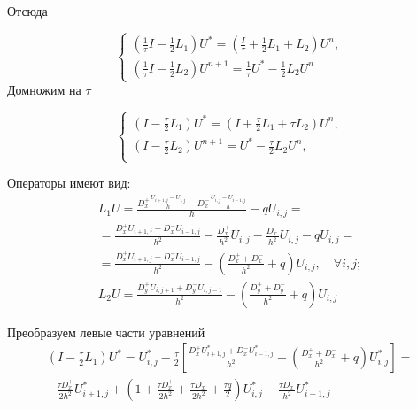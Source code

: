 \documentclass[a4paper,12pt]{article}
\begin{document}
Отсюда

\begin{equation}
  \begin{cases}
    \left( \frac{1}{\tau} I - \frac{1}{2} L_1 \right) U^* = \left( \frac{I}{\tau} + \frac{1}{2} L_1 + L_2 \right) U^n, \\
    \left( \frac{1}{\tau} I - \frac{1}{2} L_2 \right) U^{n+1} = \frac{1}{\tau} U^* - \frac{1}{2} L_2 U^n
  \end{cases}
\end{equation}
Домножим на $\tau$

\begin{equation}
  \label{eq:Douglas-Gunn-2d}
  \begin{cases}
    \left( I - \frac{\tau}{2} L_1 \right) U^* = \left( I + \frac{\tau}{2} L_1 + \tau L_2 \right) U^n, \\
    \left( I - \frac{\tau}{2} L_2 \right) U^{n+1} = U^* - \frac{\tau}{2} L_2 U^n, \\
  \end{cases}
\end{equation}

Операторы имеют вид:
\begin{equation}
  \begin{aligned}
    L_1 U = \frac{D^+_x \frac{U_{i+1,j} - U_{i,j}}{h} - D^-_x\frac{U_{i,j} - U_{i-1,j}}{h}}{h}  - qU_{i,j} = \\
    = \frac{D^+_x U_{i+1,j} + D^-_x U_{i-1,j}}{h^2} - \frac{D^+_x}{h^2}U_{i,j} - \frac{D^-_x}{h^2} U_{i,j} - q U_{i,j} = \\
    = \frac{D^+_x U_{i+1,j} + D^-_x U_{i-1,j}}{h^2} - \left(\frac{D^+_x + D^-_x}{h^2} + q \right) U_{i,j}, \quad \forall i,j; \\
    L_2 U = \frac{D^+_y U_{i,j+1} + D^-_y U_{i,j-1}}{h^2} - \left(\frac{D^+_y + D^-_y}{h^2} + q \right) U_{i,j}
  \end{aligned}
\end{equation}

Преобразуем левые части уравнений
\begin{multline*}
      \left( I - \frac{\tau}{2} L_1 \right) U^* = U^*_{i,j} - \frac{\tau}{2} \left[ \frac{D^+_x U^*_{i+1,j} + D^-_x U^*_{i-1,j}}{h^2} - \left(\frac{D^+_x + D^-_x}{h^2} + q \right) U^*_{i,j} \right] = \\
    - \frac{\tau D^+_x }{2 h^2} U^*_{i+1,j} + \left(1 + \frac{\tau D^+_x}{2h^2} + \frac{\tau D^-_x}{2 h^2} + \frac{\tau q}{2} \right) U^*_{i,j} - \frac{\tau D^-_x}{h^2} U^*_{i-1,j}
\end{multline*}
\end{document}
